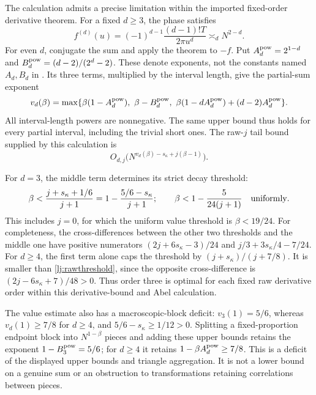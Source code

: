 \documentclass[11pt]{article}
\numberwithin{equation}{section}
\theoremstyle{definition}
\theoremstyle{remark}
\begin{document}
The calculation admits a precise limitation within the imported
fixed-order derivative theorem. For a fixed \(d\ge3\), the phase satisfies
\[
 f^{(d)}(u)=(-1)^{d-1}\frac{(d-1)!T}{2\pi u^d}
                   \asymp_d N^{2-d}.
\]
For even \(d\), conjugate the sum and apply the theorem to \(-f\).
Put \(A_d^{\rm pow}=2^{1-d}\) and
\(B_d^{\rm pow}=(d-2)/(2^d-2)\). These denote exponents, not the
constants named \(A_d,B_d\) in \cite{arias}. Its three terms, multiplied
by the interval length, give the partial-sum exponent
\begin{equation}\label{lj:orderdiagnostic}
 v_d(\beta)=\max\{\beta(1-A_d^{\rm pow}),\
                 \beta-B_d^{\rm pow},\
                 \beta(1-dA_d^{\rm pow})+(d-2)A_d^{\rm pow}\}.
\end{equation}
All interval-length powers are nonnegative. The same upper bound thus
holds for every partial interval, including the trivial short ones.
The raw-\(j\) tail bound supplied by this calculation is
\begin{equation}\label{lj:generalrawtail}
 O_{d,j}\bigl(N^{v_d(\beta)-s_\kappa+j(\beta-1)}\bigr).
\end{equation}

For \(d=3\), the middle term determines its strict decay threshold:
\begin{equation}\label{lj:rawthreshold}
 \beta<\frac{j+s_\kappa+1/6}{j+1}
       =1-\frac{5/6-s_\kappa}{j+1};
 \qquad \beta<1-\frac{5}{24(j+1)}
       \quad\hbox{uniformly}.
\end{equation}
This includes \(j=0\), for which the uniform value threshold is
\(\beta<19/24\). For completeness, the cross-differences between
the other two thresholds and the middle one have positive numerators
\((2j+6s_\kappa-3)/24\) and
\(j/3+3s_\kappa/4-7/24\).
For \(d\ge4\), the first term alone caps the threshold by
\((j+s_\kappa)/(j+7/8)\). It is smaller than
\eqref{lj:rawthreshold}, since the opposite cross-difference is
\((2j-6s_\kappa+7)/48>0\). Thus order three is optimal for each
fixed raw derivative order within this derivative-bound and Abel
calculation.

The value estimate also has a macroscopic-block deficit:
\(v_3(1)=5/6\), whereas \(v_d(1)\ge7/8\) for \(d\ge4\), and
\(5/6-s_\kappa\ge1/12>0\). Splitting a fixed-proportion endpoint
block into \(N^{1-\beta}\) pieces and adding these upper bounds
retains the exponent \(1-B_3^{\rm pow}=5/6\); for \(d\ge4\) it
retains \(1-\beta A_d^{\rm pow}\ge7/8\).
This is a deficit of the displayed upper bounds and triangle
aggregation. It is not a lower bound on a genuine sum or an obstruction
to transformations retaining correlations between pieces.
\end{document}
